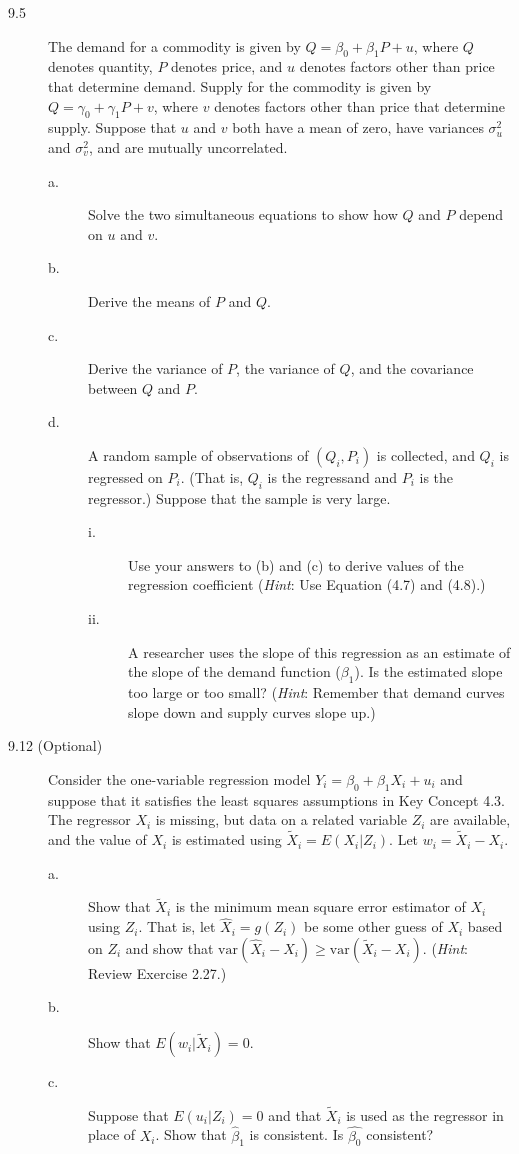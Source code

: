 \documentclass[a4paper,11pt]{article}
\newcommand{\var}{\mathrm{var}}
\begin{document}
\begin{description}
\item[{9.5}] The demand for a commodity is given by \(Q = \beta_0 + \beta_1
         P + u\), where \(Q\) denotes quantity, \(P\) denotes price, and
\(u\) denotes factors other than price that determine
demand. Supply for the commodity is given by \(Q = \gamma_0 +
         \gamma_1 P + v\), where \(v\) denotes factors other than price
that determine supply. Suppose that \(u\) and \(v\) both have a
mean of zero, have variances \(\sigma^2_u\) and \(\sigma^2_v\),
and are mutually uncorrelated.
\begin{description}
\item[{a.}] Solve the two simultaneous equations to show how \(Q\) and \(P\)
depend on \(u\) and \(v\).
\item[{b.}] Derive the means of \(P\) and \(Q\).
\item[{c.}] Derive the variance of \(P\), the variance of \(Q\), and the
covariance between \(Q\) and \(P\).
\item[{d.}] A random sample of observations of \((Q_i, P_i)\) is
collected, and \(Q_i\) is regressed on \(P_i\). (That is, \(Q_i\)
is the regressand and \(P_i\) is the regressor.) Suppose that
the sample is very large.
\begin{description}
\item[{i.}] Use your answers to (b) and (c) to derive values of the
regression coefficient (\emph{Hint}: Use Equation (4.7) and (4.8).)
\item[{ii.}] A researcher uses the slope of this regression as an
estimate of the slope of the demand function
(\(\beta_1\)). Is the estimated slope too large or too
small? (\emph{Hint}: Remember that demand curves slope down
and supply curves slope up.)
\end{description}
\end{description}

\item[{9.12 (Optional)}] Consider the one-variable regression model \(Y_i = \beta_0 +
          \beta_1 X_i + u_i\) and suppose that it satisfies the least
squares assumptions in Key Concept 4.3. The regressor \(X_i\)
is missing, but data on a related variable \(Z_i\) are
available, and the value of \(X_i\) is estimated using
\(\tilde{X}_i = E(X_i | Z_i)\). Let \(w_i = \tilde{X}_i -
          X_i\).
\begin{description}
\item[{a.}] Show that \(\tilde{X}_i\) is the minimum mean square error
estimator of \(X_i\) using \(Z_i\). That is, let \(\hat{X}_i =
          g(Z_i)\) be some other guess of \(X_i\) based on \(Z_i\) and show
that \(\var(\hat{X}_i - X_i) \geq \var(\tilde{X}_i -
          X_i)\). (\emph{Hint}: Review Exercise 2.27.)
\item[{b.}] Show that \(E(w_i | \tilde{X}_i) = 0\).
\item[{c.}] Suppose that \(E(u_i |Z_i) = 0\) and that \(\tilde{X}_i\) is
used as the regressor in place of \(X_i\). Show that
\(\hat{\beta}_1\) is consistent. Is \(\hat{\beta_0}\)
consistent?
\end{description}


\end{description}
\end{document}
